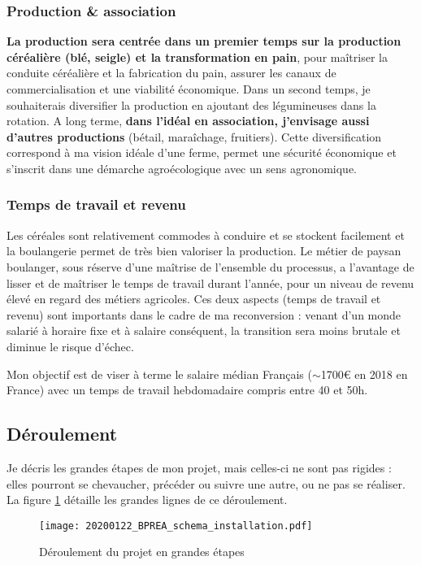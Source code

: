 \documentclass{article}
\begin{document}
\subsubsection*{Production \& association}

\textbf{La production sera centrée dans un premier temps sur la production céréalière (blé, seigle) et la transformation en pain}, pour maîtriser la conduite céréalière et la fabrication du pain, assurer les canaux de commercialisation et une viabilité économique. Dans un second temps, je souhaiterais diversifier la production en ajoutant des légumineuses dans la rotation. A long terme, \textbf{dans l'idéal en association, j'envisage aussi d'autres productions} (bétail, maraîchage, fruitiers). Cette diversification correspond à ma vision idéale d'une ferme, permet une sécurité économique et s'inscrit dans une démarche agroécologique avec un sens agronomique.

\subsubsection*{Temps de travail et revenu}

Les céréales sont relativement commodes à conduire et se stockent facilement et la boulangerie permet de très bien valoriser la production. Le métier de paysan boulanger, sous réserve d'une maîtrise de l'ensemble du processus, a l'avantage de lisser et de maîtriser le temps de travail durant l'année, pour un niveau de revenu élevé en regard des métiers agricoles. Ces deux aspects (temps de travail et revenu) sont importants dans le cadre de ma reconversion : venant d'un monde salarié à horaire fixe et à salaire conséquent, la transition sera moins brutale et diminue le risque d'échec. 

Mon objectif est de viser à terme le salaire médian Français ($\sim$1700\euro{} en 2018 en France) avec un temps de travail hebdomadaire compris entre 40 et 50h.

\subsection{Déroulement}

Je décris les grandes étapes de mon projet, mais celles-ci ne sont pas rigides : elles pourront se chevaucher, précéder ou suivre une autre, ou ne pas se réaliser. La figure \ref{fig_1} détaille les grandes lignes de ce déroulement.

\begin{figure}[h!]
\centering
		\texttt{[image: 20200122\_BPREA\_schema\_installation.pdf]}
		\label{fig_1}
		\caption{Déroulement du projet en grandes étapes}
\end{figure}
\end{document}
